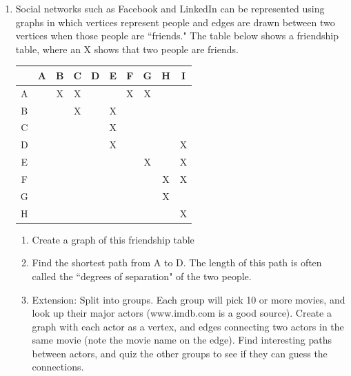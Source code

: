 \begin{enumerate}[start=33]
\item Social networks such as Facebook and LinkedIn can be represented using graphs in which vertices represent people and edges are drawn between two vertices when those people are ``friends."   The table below shows a friendship table, where an X shows that two people are friends.
\begin{center}
\begin{tabular}{|c|c|c|c|c|c|c|c|c|c|}
\hline
&A&B&C&D&E&F&G&H&I\\
\hline
A & \cellcolor{yellow}&X&X&&&X&X&&\\
\hline
B& \cellcolor{yellow}& \cellcolor{yellow}&X&&X&&&&\\
\hline
C& \cellcolor{yellow}& \cellcolor{yellow}& \cellcolor{yellow}&&X&&&&\\
\hline
D& \cellcolor{yellow}& \cellcolor{yellow}& \cellcolor{yellow}& \cellcolor{yellow}&X&&&&X\\
\hline
E& \cellcolor{yellow}& \cellcolor{yellow}& \cellcolor{yellow}& \cellcolor{yellow}& \cellcolor{yellow}&&X&&X\\
\hline
F& \cellcolor{yellow}& \cellcolor{yellow}& \cellcolor{yellow}& \cellcolor{yellow}& \cellcolor{yellow}& \cellcolor{yellow}&&X&X\\
\hline
G& \cellcolor{yellow}& \cellcolor{yellow}& \cellcolor{yellow}& \cellcolor{yellow}& \cellcolor{yellow}& \cellcolor{yellow}& \cellcolor{yellow}&X&\\
\hline
H& \cellcolor{yellow}& \cellcolor{yellow}& \cellcolor{yellow}& \cellcolor{yellow}& \cellcolor{yellow}& \cellcolor{yellow}& \cellcolor{yellow}& \cellcolor{yellow}&X\\
\hline
\end{tabular}
\end{center}
\begin{enumerate}
\item	Create a graph of this friendship table
\item	Find the shortest path from A to D.  The length of this path is often called the ``degrees of separation" of the two people.
\item	Extension:  Split into groups.  Each group will pick 10 or more movies, and look up their major actors (www.imdb.com is a good source).  Create a graph with each actor as a vertex, and edges connecting two actors in the same movie (note the movie name on the edge).  Find interesting paths between actors, and quiz the other groups to see if they can guess the connections.\\
\end{enumerate}


\end{enumerate}
